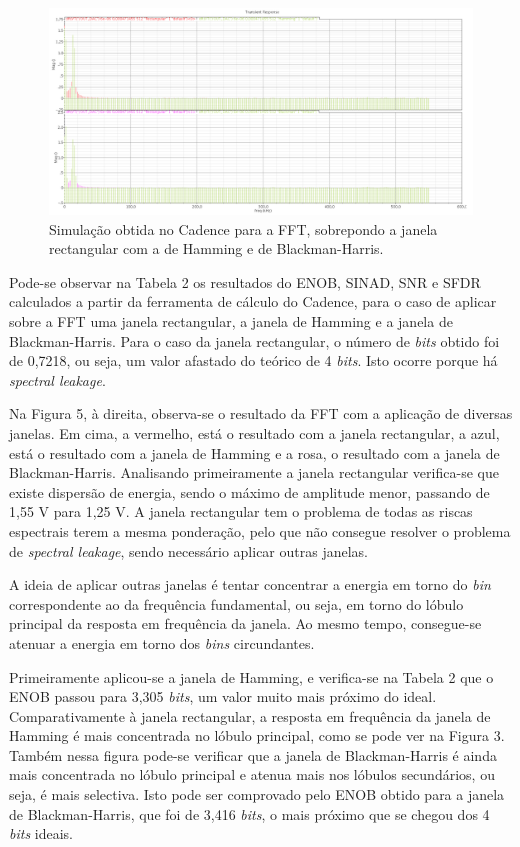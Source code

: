 \documentclass[11pt]{article}
\numberwithin{equation}{section}
\begin{document}
\begin{figure}[H]
	\centering
	\includegraphics[keepaspectratio=true, scale=0.33]{lab/f_fft_11M.png}
	\caption{Simulação obtida no Cadence para a FFT, sobrepondo a janela rectangular com a de Hamming e de Blackman-Harris.}
	\vspace{-0.8em}
\end{figure}

Pode-se observar na Tabela 2 os resultados do ENOB, SINAD, SNR e SFDR calculados a partir da ferramenta de cálculo do Cadence, para o caso de aplicar sobre a FFT uma janela rectangular, a janela de Hamming e a janela de Blackman-Harris. Para o caso da janela rectangular, o número de \textit{bits} obtido foi de 0,7218, ou seja, um valor afastado do teórico de 4 \textit{bits}. Isto ocorre porque há \textit{spectral leakage}. 

Na Figura 5, à direita, observa-se o resultado da FFT com a aplicação de diversas janelas. Em cima, a vermelho, está o resultado com a janela rectangular, a azul, está o resultado com a janela de Hamming e a rosa, o resultado com a janela de Blackman-Harris. Analisando primeiramente a janela rectangular verifica-se que existe dispersão de energia, sendo o máximo de amplitude menor, passando de 1,55 V para 1,25 V. A janela rectangular tem o problema de todas as riscas espectrais terem a mesma ponderação, pelo que não consegue resolver o problema de \textit{spectral leakage}, sendo necessário aplicar outras janelas.

A ideia de aplicar outras janelas é tentar concentrar a energia em torno do \textit{bin} correspondente ao da frequência fundamental, ou seja, em torno do lóbulo principal da resposta em frequência da janela. Ao mesmo tempo, consegue-se atenuar a energia em torno dos \textit{bins} circundantes.

Primeiramente aplicou-se a janela de Hamming, e verifica-se na Tabela 2 que o ENOB passou para 3,305 \textit{bits}, um valor muito mais próximo do ideal. Comparativamente à janela rectangular, a resposta em frequência da janela de Hamming é mais concentrada no lóbulo principal, como se pode ver na Figura 3. Também nessa figura pode-se verificar que a janela de Blackman-Harris é ainda mais concentrada no lóbulo principal e atenua mais nos lóbulos secundários, ou seja, é mais selectiva. Isto pode ser comprovado pelo ENOB obtido para a janela de Blackman-Harris, que foi de 3,416 \textit{bits}, o mais próximo que se chegou dos 4 \textit{bits} ideais.
\end{document}
